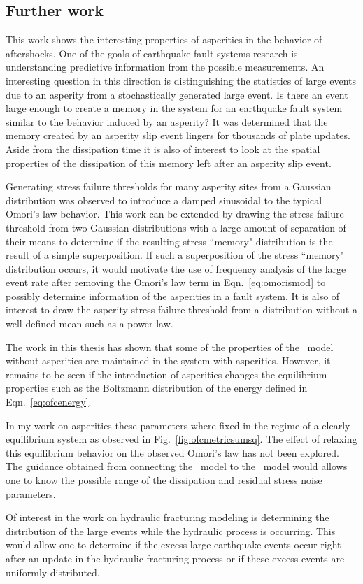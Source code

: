 \subsection{Further work}

This work shows the interesting properties of asperities in the behavior of aftershocks. One of the goals of earthquake fault systems research is  understanding predictive information from the possible measurements. An interesting question in this  direction is distinguishing the statistics of large events due to  an asperity from a stochastically generated large event. Is there an event large enough to create a memory in the  system for an earthquake fault system similar to the behavior induced by an asperity? It was determined that the memory created by an asperity slip event lingers for thousands of plate updates. Aside from the dissipation time it is also of interest to look at the spatial properties of the dissipation of this memory left after an asperity slip event. 

Generating stress failure thresholds for many asperity sites from a Gaussian distribution was observed to introduce a damped sinusoidal to the typical Omori's law behavior. This work can be extended by drawing the stress failure threshold from two Gaussian distributions with a large amount of separation of their means  to determine if  the resulting stress ``memory" distribution is the result of a simple superposition. If such a superposition of the stress ``memory" distribution occurs, it would motivate the use of frequency analysis of the large event rate after removing the Omori's law term in Eqn.~\eqref{eq:omorismod} to possibly determine information of the asperities in a fault system. It is also of interest to draw the asperity stress failure threshold from a distribution without a well defined mean such as a power law.


The work in this thesis has shown that some of the properties of the \ofc\ model without asperities are maintained in the system with asperities. However, it remains to be seen if the introduction of asperities changes the equilibrium properties such as the Boltzmann distribution of the energy defined in Eqn.~\eqref{eq:ofcenergy}. 

In my work on asperities these parameters where fixed in the regime of a clearly equilibrium system as observed in Fig.~\ref{fig:ofcmetricsumsq}. The effect of relaxing this equilibrium behavior on the observed Omori's law has not been explored. The guidance obtained from connecting the \ofc\ model to the \rjb\ model would allows one to know the possible range of the dissipation and residual stress noise parameters. 

Of interest in the work on hydraulic fracturing modeling is determining the distribution of the large events while the hydraulic process is occurring. This would allow one to determine if the excess large earthquake events  occur right after an update in the hydraulic fracturing process or if these excess events are uniformly distributed.


